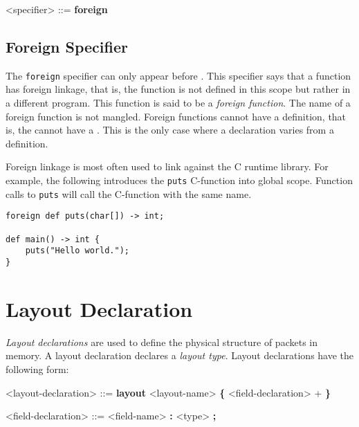 \begin{grammar}
\singlespace
<specifier> ::= \textbf{foreign}
\end{grammar}

\subsection{Foreign Specifier} \label{foreign_spec}

The \texttt{foreign} specifier can only appear before . This specifier says that a function has foreign linkage, that is, the function is not defined in this scope but rather in a different program. This function is said to be a \textit{foreign function}. The name of a foreign function is not mangled. Foreign functions cannot have a definition, that is, the  cannot have a . This is the only case where a declaration varies from a definition.

Foreign linkage is most often used to link against the C runtime library. For example, the following introduces the \texttt{puts} C-function into global scope. Function calls to \texttt{puts} will call the C-function with the same name.

\noindent\begin{minipage}{\linewidth}
\begin{lstlisting}
foreign def puts(char[]) -> int;

def main() -> int {
	puts("Hello world.");
}
\end{lstlisting}
\end{minipage}
 
\section{Layout Declaration} \label{layout_guide}

\textit{Layout declarations} are used to define the physical structure of packets in memory. A layout declaration declares a \textit{layout type}. Layout declarations have the following form:

\begin{minip}
\begin{grammar}
<layout-declaration> ::=
\textbf{layout} <layout-name> 
\textbf{\{}
	<field-declaration> +
\textbf{\}}

<field-declaration> ::=
<field-name> \textbf{:} <type> \textbf{;}
\end{grammar}
\end{minip}

